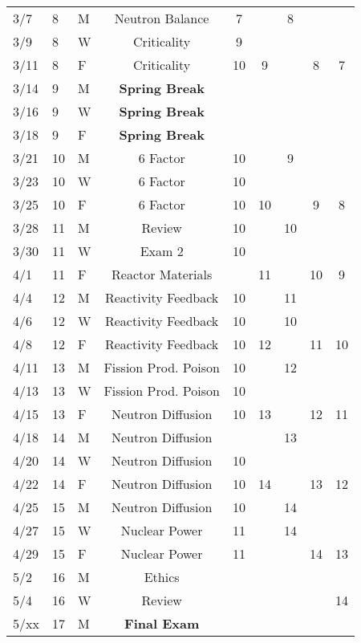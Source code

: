 \documentclass[11pt, a4paper]{article}
\begin{document}
\begin{table}[h]
\begin{center}
\begin{tabular}{lllcccccc}
3/7 & 8 & M & Neutron Balance     & 7 &  & 8 &  &  \\
3/9 & 8 & W & Criticality         & 9 &   &  &  &  \\
3/11 & 8 & F & Criticality        & 10 & 9 &  & 8 & 7 \\
3/14 & 9 & M & \textbf{Spring Break}&  &  &  &  &  \\
3/16 & 9 & W & \textbf{Spring Break}&  &  &  &  &  \\
3/18 & 9 & F & \textbf{Spring Break}&  &  &  &  &  \\
3/21 & 10 & M & 6 Factor          & 10 &  & 9 &  &  \\
3/23 & 10 & W & 6 Factor          & 10 &  &  &  &  \\
3/25 & 10 & F & 6 Factor          & 10 & 10 &  & 9 & 8 \\
3/28 & 11 & M & Review            & 10 &  & 10 &  &  \\
3/30 & 11 & W & Exam 2            & 10 &  &  &  & \\
4/1 & 11 & F & Reactor Materials  &  &  11 &  & 10 & 9 \\
4/4 & 12 & M & Reactivity Feedback &  10  &   & 11 &  &  \\
4/6 & 12 & W & Reactivity Feedback & 10  &  & 10 &  &  \\
4/8 & 12 & F & Reactivity Feedback & 10 & 12 &  & 11 & 10 \\
4/11 & 13 & M & Fission Prod. Poison & 10 &  & 12 & &  \\
4/13 & 13 & W & Fission Prod. Poison & 10 &  &  &  &  \\
4/15 & 13 & F & Neutron Diffusion    & 10 & 13 &  & 12 & 11 \\
4/18 & 14 & M & Neutron Diffusion    &  &  & 13  &  &  \\
4/20 & 14 & W & Neutron Diffusion    & 10 & &  &  & \\
4/22 & 14 & F & Neutron Diffusion    & 10 & 14 &  & 13 & 12 \\
4/25 & 15 & M & Neutron Diffusion    & 10  &  & 14 & &  \\
4/27 & 15 & W & Nuclear Power        & 11 &  & 14 &  &  \\
4/29 & 15 & F & Nuclear Power        & 11 &  &  & 14 & 13 \\
5/2 & 16 & M & Ethics                &  &  & &  &      \\
5/4 & 16 & W &  Review               &  &  &  &  &  14 \\
5/xx & 17 & M & \textbf{Final Exam}  &  &  &  &  &     \\
\end{tabular}
\end{center}
\end{table}
\FloatBarrier



\end{document}
